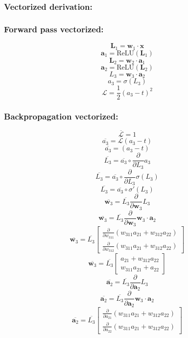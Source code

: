 \documentclass{article}
\begin{document}
\subsubsection{Vectorized derivation:}
\subsubsection{Forward pass vectorized:}
\[\bm{L}_1 = \bm{w}_1 \cdot \bm{x} \]
\[\bm{a}_1 = \text{ReLU}(\bm{L}_1) \]
\[\bm{L}_2 = \bm{w}_2 \cdot \bm{a}_1\]
\[\bm{a}_2 = \text{ReLU}(\bm{L}_2)\]
\[L_3 = \bm{w}_3 \cdot \bm{a}_2\]
\[a_3 = \sigma(L_3)\]
\[\mathcal{L} = \frac{1}{2}(a_3-t)^2\]
\subsubsection{Backpropagation vectorized:}
\begin{equation}\overline{\mathcal{L}} = 1\end{equation}
\[\overline{a_3} = \overline{\mathcal{L}} (a_3 - t)\]
\[\overline{a_3} = (a_3 - t)\]
\[\overline{L_3} = \overline{a_3} \circ \frac{\partial}{\partial{L_3}} a_3\]
\[\overline{L_3} = \overline{a_3} \circ \frac{\partial}{\partial{L_3}} \sigma(L_3)\]
\begin{equation}\overline{L_3} = \overline{a_3} \circ \sigma ' (L_3)\end{equation}
\[\overline{\bm{w}_3} = \overline{L_3} \frac{\partial}{\partial{\bm{w}_3}} L_3\]
\[\overline{\bm{w}_3} = \overline{L_3} \frac{\partial}{\partial{\bm{w}_3}} \bm{w}_3 \cdot \bm{a}_2\]
\[\overline{\bm{w}_3} = \overline{L_3} \begin{bmatrix}\frac{\partial{}}{\partial{w_{311}}} (w_{311}a_{21} + w_{312}a_{22})\\ \frac{\partial}{\partial{w_{312}}}(w_{311}a_{21} + w_{312}a_{22})\end{bmatrix}\]
\begin{equation}\overline{\bm{w}_3} = \overline{L_3} \begin{bmatrix}a_{21} + w_{312}a_{22}\\ w_{311}a_{21} + a_{22}\end{bmatrix}\end{equation}
\[\overline{\bm{a}_2} = \overline{L_3} \frac{\partial}{\partial{\bm{a}_2}} L_3\]
\[\overline{\bm{a}_2} = \overline{L_3} \frac{\partial}{\partial{\bm{a}_2}} \bm{w}_3 \cdot \bm{a}_2\]
\[\overline{\bm{a}_2} = \overline{L_3} \begin{bmatrix}\frac{\partial{}}{\partial{a_{21}}} (w_{311}a_{21} + w_{312}a_{22})\\ \frac{\partial}{\partial{a_{22}}}(w_{311}a_{21} + w_{312}a_{22})\end{bmatrix}\]
\end{document}
